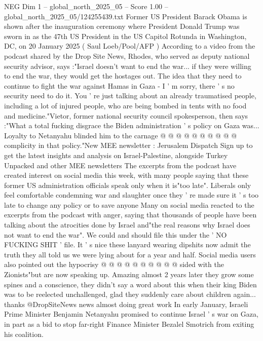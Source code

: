 \begin{textsample}{NEG Dim 1 – global\_north\_2025\_05 – Score 1.00 – global\_north\_2025\_05/124255439.txt}  \label{ex:f1_neg_082}
Former US President Barack Obama is shown after the inauguration ceremony where President Donald Trump was sworn in as the 47th US President in the US Capitol Rotunda in Washington, DC, on 20 January 2025 ( Saul Loeb/Pool/AFP ) According to a video from the podcast shared by the Drop Site News, Rhodes, who served as deputy national security advisor, says :"Israel doesn't want to end the war... if they were willing to end the war, they would get the hostages out.
The idea that they need to continue to fight the war against Hamas in Gaza - I ' m sorry, there ' s no security need to do it.
You ' re just talking about an already traumatised people, including a lot of injured people, who are being bombed in tents with no food and medicine."Vietor, former national security council spokesperson, then says :"What a total fucking disgrace the Biden administration ' s policy on Gaza was...
Loyalty to Netanyahu blinded him to the carnage @ @ @ @ @ @ @ @ @ @ complicity in that policy."New MEE newsletter : Jerusalem Dispatch Sign up to get the latest insights and analysis on Israel-Palestine, alongside Turkey Unpacked and other MEE newsletters The excerpts from the podcast have created interest on social media this week, with many people saying that these former US administration officials speak only when it is"too late".
Liberals only feel comfortable condemning war and slaughter once they ' re made sure it ' s too late to change any policy or to save anyone Many on social media reacted to the excerpts from the podcast with anger, saying that thousands of people have been talking about the atrocities done by Israel and"the real reasons why Israel does not want to end the war".
We could and should file this under the ' NO FUCKING SHIT ' file.
It ' s nice these lanyard wearing dipshits now admit the truth they all told us we were lying about for a year and half.
Social media users also pointed out the hypocrisy @ @ @ @ @ @ @ @ @ @ sided with the Zionists"but are now speaking up.
Amazing almost 2 years later they grow some spines and a conscience, they didn't say a word about this when their king Biden was to be reelected unchallenged, glad they suddenly care about children again... thanks @DropSiteNews news almost doing great work In early January, Israeli Prime Minister Benjamin Netanyahu promised to continue Israel ' s war on Gaza, in part as a bid to stop far-right Finance Minister Bezalel Smotrich from exiting his coalition.

\end{textsample}

